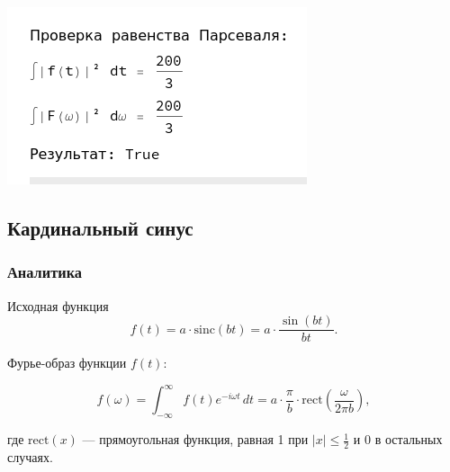 \documentclass[a4paper,12pt]{article}
\begin{document}
\begin{center}
\hfill
\begin{minipage}{0.32\textwidth}
  \centering
  \includegraphics[width=\linewidth]{images/2P54.png}
\end{minipage}
\end{center}

\subsection{Кардинальный синус}
\subsubsection{Аналитика}
 Исходная функция
\[
f(t) = a \cdot \text{sinc}(b t) = a \cdot \frac{\sin(b t)}{b t}.
\]

Фурье-образ функции \( f(t) \):

\[
\hat{f}(\omega) = \int_{-\infty}^{\infty} f(t) e^{-i \omega t} \, dt = a \cdot \frac{\pi}{b} \cdot \text{rect}\left(\frac{\omega}{2 \pi b}\right),
\]

где \( \text{rect}(x) \) — прямоугольная функция, равная 1 при \( |x| \leq \frac{1}{2} \) и 0 в остальных случаях. 
\end{document}
